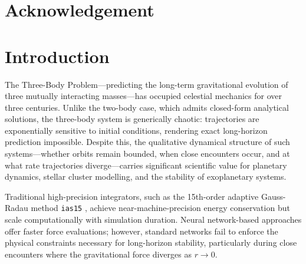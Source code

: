 \documentclass[12pt,a4paper]{article}
\newcommand{\ias}{\texttt{ias15}}
\begin{document}
\section*{Acknowledgement}


\newpage



\tableofcontents
\newpage

\setcounter{page}{1}

\section{Introduction}
\label{sec:intro}

The Three-Body Problem---predicting the long-term gravitational evolution of three mutually interacting masses---has occupied celestial mechanics for over three centuries. Unlike the two-body case, which admits closed-form analytical solutions, the three-body system is generically chaotic: trajectories are exponentially sensitive to initial conditions, rendering exact long-horizon prediction impossible. Despite this, the qualitative dynamical structure of such systems---whether orbits remain bounded, when close encounters occur, and at what rate trajectories diverge---carries significant scientific value for planetary dynamics, stellar cluster modelling, and the stability of exoplanetary systems.

Traditional high-precision integrators, such as the 15th-order adaptive Gauss-Radau method \ias{} \citep{Rein_2014}, achieve near-machine-precision energy conservation but scale computationally with simulation duration. Neural network-based approaches offer faster force evaluations; however, standard networks fail to enforce the physical constraints necessary for long-horizon stability, particularly during close encounters where the gravitational force diverges as $r \to 0$.
\end{document}
